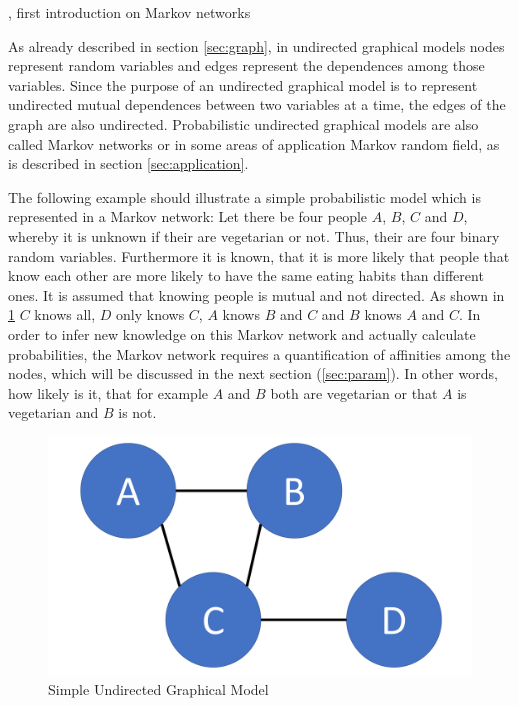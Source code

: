 \cite{hammersley1971markov}, first introduction on Markov networks

As already described in section \ref{sec:graph}, in undirected graphical models nodes represent random variables and edges represent the dependences among those variables. Since the purpose of an undirected graphical model is to represent undirected mutual dependences between two variables at a time, the edges of the graph are also undirected. Probabilistic undirected graphical models are also called Markov networks or in some areas of application Markov random field, as is described in section \ref{sec:application}.

The following example should illustrate a simple probabilistic model which is represented in a Markov network: Let there be four people $A$, $B$, $C$ and $D$, whereby it is unknown if their are vegetarian or not. Thus, their are four binary random variables. Furthermore it is known, that it is more likely that people that know each other are more likely to have the same eating habits than different ones. It is assumed that knowing people is mutual and not directed. As shown in \ref{fig:basic} $C$ knows all, $D$ only knows $C$, $A$ knows $B$ and $C$ and $B$ knows $A$ and $C$. In order to infer new knowledge on this Markov network and actually calculate probabilities, the Markov network requires a quantification of affinities among the nodes, which will be discussed in the next section (\ref{sec:param}). In other words, how likely is it, that for example $A$ and $B$ both are vegetarian or that $A$ is vegetarian and $B$ is not.

\begin{figure}[htpb]
  \centering
  	\includegraphics[scale=0.3]{img/basic.pdf} 
  \caption{Simple Undirected Graphical Model}
  \label{fig:basic}
\end{figure}

